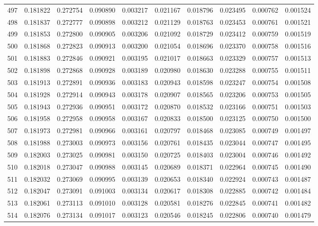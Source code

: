 \begin{tabular}{lrrrrrrrrr}
497 & 0.181822 & 0.272754 & 0.090890 & 0.003217 & 0.021167 & 0.018796 & 0.023495 & 0.000762 & 0.001524 \\
498 & 0.181837 & 0.272777 & 0.090898 & 0.003212 & 0.021129 & 0.018763 & 0.023453 & 0.000761 & 0.001521 \\
499 & 0.181853 & 0.272800 & 0.090905 & 0.003206 & 0.021092 & 0.018729 & 0.023412 & 0.000759 & 0.001519 \\
500 & 0.181868 & 0.272823 & 0.090913 & 0.003200 & 0.021054 & 0.018696 & 0.023370 & 0.000758 & 0.001516 \\
501 & 0.181883 & 0.272846 & 0.090921 & 0.003195 & 0.021017 & 0.018663 & 0.023329 & 0.000757 & 0.001513 \\
502 & 0.181898 & 0.272868 & 0.090928 & 0.003189 & 0.020980 & 0.018630 & 0.023288 & 0.000755 & 0.001511 \\
503 & 0.181913 & 0.272891 & 0.090936 & 0.003183 & 0.020943 & 0.018598 & 0.023247 & 0.000754 & 0.001508 \\
504 & 0.181928 & 0.272914 & 0.090943 & 0.003178 & 0.020907 & 0.018565 & 0.023206 & 0.000753 & 0.001505 \\
505 & 0.181943 & 0.272936 & 0.090951 & 0.003172 & 0.020870 & 0.018532 & 0.023166 & 0.000751 & 0.001503 \\
506 & 0.181958 & 0.272958 & 0.090958 & 0.003167 & 0.020833 & 0.018500 & 0.023125 & 0.000750 & 0.001500 \\
507 & 0.181973 & 0.272981 & 0.090966 & 0.003161 & 0.020797 & 0.018468 & 0.023085 & 0.000749 & 0.001497 \\
508 & 0.181988 & 0.273003 & 0.090973 & 0.003156 & 0.020761 & 0.018435 & 0.023044 & 0.000747 & 0.001495 \\
509 & 0.182003 & 0.273025 & 0.090981 & 0.003150 & 0.020725 & 0.018403 & 0.023004 & 0.000746 & 0.001492 \\
510 & 0.182018 & 0.273047 & 0.090988 & 0.003145 & 0.020689 & 0.018371 & 0.022964 & 0.000745 & 0.001490 \\
511 & 0.182032 & 0.273069 & 0.090995 & 0.003139 & 0.020653 & 0.018340 & 0.022924 & 0.000743 & 0.001487 \\
512 & 0.182047 & 0.273091 & 0.091003 & 0.003134 & 0.020617 & 0.018308 & 0.022885 & 0.000742 & 0.001484 \\
513 & 0.182061 & 0.273113 & 0.091010 & 0.003128 & 0.020581 & 0.018276 & 0.022845 & 0.000741 & 0.001482 \\
514 & 0.182076 & 0.273134 & 0.091017 & 0.003123 & 0.020546 & 0.018245 & 0.022806 & 0.000740 & 0.001479 \\

\end{tabular}
